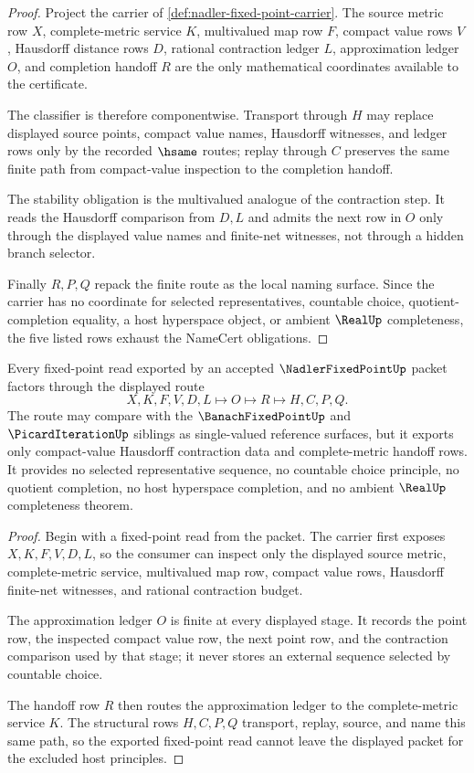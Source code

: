 \begin{proof}
Project the carrier of \autoref{def:nadler-fixed-point-carrier}. The source metric row $X$, complete-metric service $K$, multivalued map row $F$, compact value rows $V$, Hausdorff distance rows $D$, rational contraction ledger $L$, approximation ledger $O$, and completion handoff $R$ are the only mathematical coordinates available to the certificate.

The classifier is therefore componentwise. Transport through $H$ may replace displayed source points, compact value names, Hausdorff witnesses, and ledger rows only by the recorded $\hsame$ routes; replay through $C$ preserves the same finite path from compact-value inspection to the completion handoff.

The stability obligation is the multivalued analogue of the contraction step. It reads the Hausdorff comparison from $D,L$ and admits the next row in $O$ only through the displayed value names and finite-net witnesses, not through a hidden branch selector.

Finally $R,P,Q$ repack the finite route as the local naming surface. Since the carrier has no coordinate for selected representatives, countable choice, quotient-completion equality, a host hyperspace object, or ambient $\RealUp$ completeness, the five listed rows exhaust the NameCert obligations.
\end{proof}

\begin{theorem}\label{thm:nadler-fixed-point-approximation-route-nonescape}
Every fixed-point read exported by an accepted $\NadlerFixedPointUp$ packet factors through the displayed route
$$
X,K,F,V,D,L \longmapsto O \longmapsto R \longmapsto H,C,P,Q .
$$
The route may compare with the $\BanachFixedPointUp$ and $\PicardIterationUp$ siblings as single-valued reference surfaces, but it exports only compact-value Hausdorff contraction data and complete-metric handoff rows. It provides no selected representative sequence, no countable choice principle, no quotient completion, no host hyperspace completion, and no ambient $\RealUp$ completeness theorem.
\end{theorem}
\begin{proof}
Begin with a fixed-point read from the packet. The carrier first exposes $X,K,F,V,D,L$, so the consumer can inspect only the displayed source metric, complete-metric service, multivalued map row, compact value rows, Hausdorff finite-net witnesses, and rational contraction budget.

The approximation ledger $O$ is finite at every displayed stage. It records the point row, the inspected compact value row, the next point row, and the contraction comparison used by that stage; it never stores an external sequence selected by countable choice.

The handoff row $R$ then routes the approximation ledger to the complete-metric service $K$. The structural rows $H,C,P,Q$ transport, replay, source, and name this same path, so the exported fixed-point read cannot leave the displayed packet for the excluded host principles.
\end{proof}

